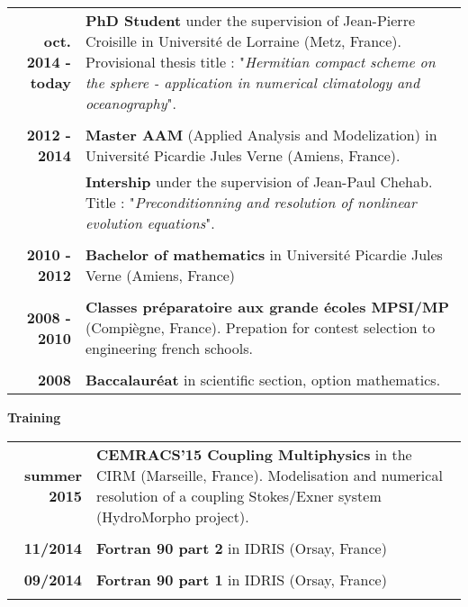 \documentclass[10pt,a4paper]{report}
\begin{document}
\begin{center}
\begin{tabular}{r p{12cm}}
\textbf{oct. 2014 - today} & \textbf{PhD Student} under the supervision of Jean-Pierre Croisille in Université de Lorraine (Metz, France). Provisional thesis title : "\textit{Hermitian compact scheme on the sphere - application in numerical climatology and oceanography}".\\

& \\

\textbf{2012 - 2014} & \textbf{Master AAM} (Applied Analysis and Modelization) in Université Picardie Jules Verne (Amiens, France). \\

& \textbf{Intership} under the supervision of Jean-Paul Chehab. Title : "\textit{Preconditionning and resolution of nonlinear evolution equations}". \\

& \\

\textbf{2010 - 2012} & \textbf{Bachelor of mathematics} in Université Picardie Jules Verne (Amiens, France) \\

& \\

\textbf{2008 - 2010} & \textbf{Classes préparatoire aux grande écoles MPSI/MP} (Compiègne, France). Prepation for contest selection to engineering french schools. \\

& \\

\textbf{2008} & \textbf{Baccalauréat} in scientific section, option mathematics.\\
\end{tabular}
\end{center}

\vspace{0.4cm}
\noindent
{\selectfont
\textbf{Training}
}

\begin{center}
\begin{tabular}{r p{12cm}}
\textbf{summer 2015} & \textbf{CEMRACS'15 Coupling Multiphysics} in the CIRM (Marseille, France). Modelisation and numerical resolution of a coupling Stokes/Exner system (HydroMorpho project).\\

& \\

\textbf{11/2014} & \textbf{Fortran 90 part 2} in IDRIS (Orsay, France)\\

& \\

\textbf{09/2014} & \textbf{Fortran 90 part 1} in IDRIS (Orsay, France)\\

& \\

\end{tabular}
\end{center}
\end{document}
